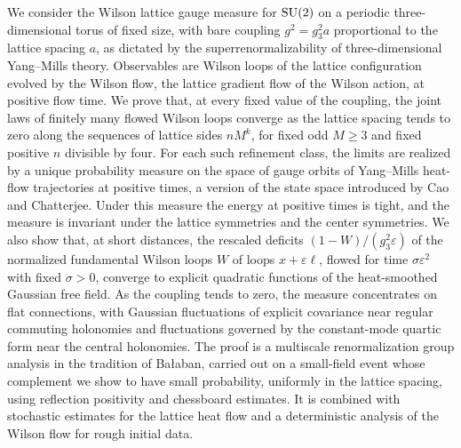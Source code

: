 We consider the Wilson lattice gauge measure for $\mathrm{SU}(2)$ on a periodic three-dimensional torus of fixed size, with bare coupling $g^2=g_3^2a$ proportional to the lattice spacing $a$, as dictated by the superrenormalizability of three-dimensional Yang--Mills theory. Observables are Wilson loops of the lattice configuration evolved by the Wilson flow, the lattice gradient flow of the Wilson action, at positive flow time. We prove that, at every fixed value of the coupling, the joint laws of finitely many flowed Wilson loops converge as the lattice spacing tends to zero along the sequences of lattice sides $nM^k$, for fixed odd $M\ge3$ and fixed positive $n$ divisible by four. For each such refinement class, the limits are realized by a unique probability measure on the space of gauge orbits of Yang--Mills heat-flow trajectories at positive times, a version of the state space introduced by Cao and Chatterjee. Under this measure the energy at positive times is tight, and the measure is invariant under the lattice symmetries and the center symmetries. We also show that, at short distances, the rescaled deficits $(1-W)/(g_3^2\varepsilon)$ of the normalized fundamental Wilson loops $W$ of loops $x+\varepsilon\ell$, flowed for time $\sigma\varepsilon^2$ with fixed $\sigma>0$, converge to explicit quadratic functions of the heat-smoothed Gaussian free field. As the coupling tends to zero, the measure concentrates on flat connections, with Gaussian fluctuations of explicit covariance near regular commuting holonomies and fluctuations governed by the constant-mode quartic form near the central holonomies. The proof is a multiscale renormalization group analysis in the tradition of Bałaban, carried out on a small-field event whose complement we show to have small probability, uniformly in the lattice spacing, using reflection positivity and chessboard estimates. It is combined with stochastic estimates for the lattice heat flow and a deterministic analysis of the Wilson flow for rough initial data.
